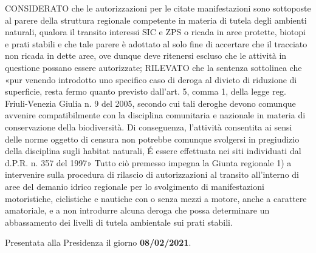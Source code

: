\documentclass[a4paper,12pt,twoside]{article}
\begin{document}
\begin{flushleft}
CONSIDERATO che le autorizzazioni per le citate manifestazioni sono sottoposte al parere della struttura 
regionale competente in materia di tutela degli ambienti naturali, qualora il transito interessi SIC e ZPS 
o ricada in aree protette, biotopi e prati stabili e che tale parere è adottato al solo fine di 
accertare che il tracciato non ricada in dette aree, ove dunque deve ritenersi escluso che le attività in 
questione possano essere autorizzate; RILEVATO che la sentenza sottolinea che «pur venendo 
introdotto uno specifico caso di deroga al divieto di riduzione di superficie, resta fermo quanto previsto 
dall'art. 5, comma 1, della legge reg. Friuli-Venezia Giulia n. 9 del 2005, secondo cui tali deroghe 
devono comunque avvenire compatibilmente con la disciplina comunitaria e nazionale in materia di 
conservazione della biodiversità. Di conseguenza, l'attività consentita ai sensi delle norme oggetto
 di censura non potrebbe comunque svolgersi in pregiudizio della disciplina sugli habitat naturali, 
 É essere effettuata nei siti individuati dal d.P.R. n. 357 del 1997» Tutto 
 ciò premesso impegna la Giunta regionale 1) a intervenire sulla procedura di rilascio di 
 autorizzazioni al transito all'interno di aree del demanio idrico regionale per lo svolgimento 
 di manifestazioni motoristiche, ciclistiche e nautiche con o senza mezzi a motore, anche a carattere 
 amatoriale, e a non introdurre alcuna deroga che possa determinare un abbassamento dei livelli di tutela 
 ambientale sui prati stabili.
\end{flushleft}

\begin{flushleft}
Presentata alla Presidenza il giorno \textbf{08/02/2021}.
\end{flushleft}
\end{document}
